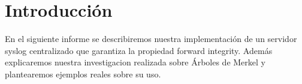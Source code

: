 \section{Introducción}

En el siguiente informe se describiremos nuestra implementación de un servidor syslog centralizado que
garantiza la propiedad forward integrity. Además explicaremos nuestra investigacion realizada sobre Árboles
de Merkel y plantearemos ejemplos reales sobre su uso.

